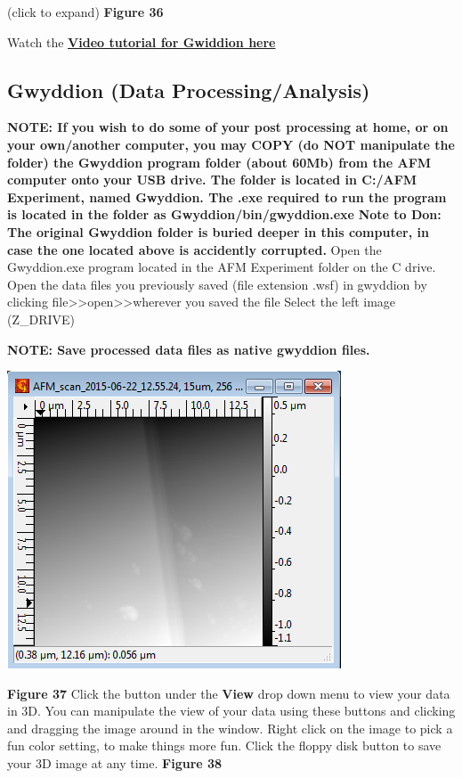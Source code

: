 \documentclass{../lab}
\begin{document}
 (click to expand)
\textbf{Figure 36}

Watch the \href{http://experimentationlab.berkeley.edu/sites/default/files/AFMImages/gwyddion1.mp4.mp4}{\textbf{Video tutorial for Gwiddion here}}

\subsection{Gwyddion (Data Processing/Analysis)}
\textbf{NOTE: If you wish to do some of your post processing at home, or on your own/another computer, you may COPY (do NOT manipulate the folder) the Gwyddion program folder (about 60Mb) from the AFM computer onto your USB drive.  The folder is located in C:/AFM Experiment, named Gwyddion.  The .exe required to run the program is located in the folder as Gwyddion/bin/gwyddion.exe}
\textbf{Note to Don: The original Gwyddion folder is buried deeper in this computer, in case the one located above is accidently corrupted.}
Open the Gwyddion.exe program located in the AFM Experiment folder on the C drive.
Open the data files you previously saved (file extension .wsf) in gwyddion by clicking file>>open>>wherever you saved the file
Select the left image (Z\_DRIVE)

\textbf{NOTE: Save processed data files as native gwyddion files.}

\begin{center}
    \href{http://experimentationlab.berkeley.edu/sites/default/files/AFMImages/40.png}{\includegraphics[width=0.5\linewidth]{images/40.png}}
\end{center}


\textbf{Figure 37}
Click the  button under the \textbf{View} drop down menu to view your data in 3D.
You can manipulate the view of your data using these buttons and clicking and dragging the image around in the window.
Right click on the image to pick a fun color setting, to make things more fun.
Click the floppy disk button to save your 3D image at any time.
\textbf{Figure 38}
\end{document}
